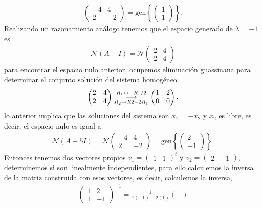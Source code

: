 \documentclass[11pt,letterpaper]{article}
\newcommand{\mcN}{\mathcal{N}}
\newcommand{\grstep}[2][\relax]{%
   \ensuremath{\mathrel{
       {\mathop{\longrightarrow}\limits^{#2\mathstrut}_{
                                     \begin{subarray}{l} #1 \end{subarray}}}}}}
\newcommand{\gen}{\text{gen}}
\begin{document}
\begin{enumerate}
\begin{align*}
\begin{pmatrix}
-4 & 4 \\
2 & -2 
\end{pmatrix}=\gen \left\{\begin{pmatrix}
1\\
1
\end{pmatrix} \right\}.
\end{align*}
Realizando un razonamiento análogo tenemos que  el espacio generado de $\lambda=-1$ es
\begin{align*}
\mcN (A+I)=\mcN\begin{pmatrix}
2 & 4 \\
2 & 4 
\end{pmatrix}
\end{align*}
para encontrar el espacio nulo anterior, ocupemos eliminación guassinana para determinar el conjunto solución del sistema homogéneo. 
\begin{align*}
\begin{pmatrix}
2 & 4 \\
2 & 4 
\end{pmatrix}%
\grstep[R_2\rightarrow R2-2R_1]{R_1 \leftrightarrow -R_1/2}
%
\begin{pmatrix}
1 & 2 \\
0 & 0 
\end{pmatrix},
\end{align*}
lo anterior implica que las soluciones del sistema son $x_1=-x_2$ y $x_2$ es libre, es decir, el espacio nulo es igual a 
\begin{align*}
\mcN (A-5I)=\mcN\begin{pmatrix}
-4 & 4 \\
2 & -2 
\end{pmatrix}=\gen \left\{\begin{pmatrix}
2\\
-1
\end{pmatrix} \right\}.
\end{align*}
Entonces tenemos dos vectores propios $v_1=\begin{pmatrix}
1& 1
\end{pmatrix}^t$ y $v_2=\begin{pmatrix}
2& -1
\end{pmatrix}$, determinemos si son linealmente independientes, para ello calculemos la inversa de la matriz construida con esos vectores, es decir, calculemos la inversa,
\begin{align*}
\begin{pmatrix}
1& 2\\
1&-1
\end{pmatrix}^{-1}=\frac{1}{1(-1)-2(1)}\begin{pmatrix}

\end{pmatrix}
\end{align*}
\end{enumerate}
\end{document}
